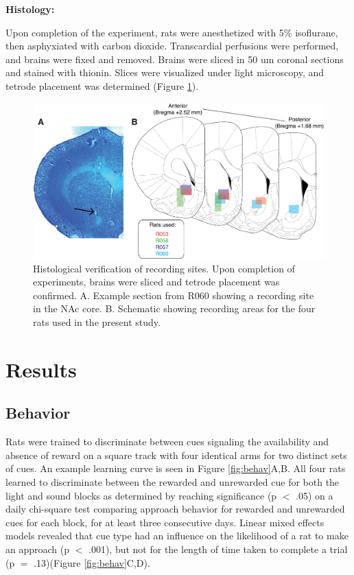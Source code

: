 \documentclass[11pt]{article}
\begin{document}
{\bf Histology:}

Upon completion of the experiment, rats were anesthetized with 5\% isoflurane, then asphyxiated with carbon dioxide. Transcardial perfusions were performed, and brains were fixed and removed. Brains were sliced in 50 um coronal sections and stained with thionin. Slices were visualized under light microscopy, and tetrode placement was determined (Figure \ref{fig:histo}).

\begin{figure}[h]
\centering
\includegraphics[width=\textwidth]{Fig 3 - Histology.png}
\caption{Histological verification of recording sites. Upon completion of experiments, brains were sliced and tetrode placement was confirmed. A. Example section from R060 showing a recording site in the NAc core. B. Schematic showing recording areas for the four rats used in the present study.}
\label{fig:histo}
\end{figure}

\section*{Results}

\subsection*{Behavior}

Rats were trained to discriminate between cues signaling the availability and absence of reward on a square track with four identical arms for two distinct sets of cues. An example learning curve is seen in Figure \ref{fig:behav}A,B. All four rats learned to discriminate between the rewarded and unrewarded cue for both the light and sound blocks as determined by reaching significance (p $<$ .05) on a daily chi-square test comparing approach behavior for rewarded and unrewarded cues for each block, for at least three consecutive days. Linear mixed effects models revealed that cue type had an influence on the likelihood of a rat to make an approach (p $<$ .001), but not for the length of time taken to complete a trial (p $=$ .13)(Figure \ref{fig:behav}C,D).
\end{document}
